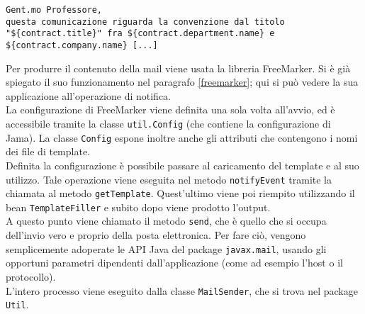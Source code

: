 \begin{lstlisting}
Gent.mo Professore,
questa comunicazione riguarda la convenzione dal titolo "${contract.title}" fra ${contract.department.name} e ${contract.company.name} [...]
\end{lstlisting}

Per produrre il contenuto della mail viene usata la libreria FreeMarker. Si è già spiegato il suo funzionamento nel paragrafo \ref{freemarker}; qui si può vedere la sua applicazione all'operazione di notifica.\\
La configurazione di FreeMarker viene definita una sola volta all'avvio, ed è accessibile tramite la classe \lstinline{util.Config} (che contiene la configurazione di Jama). La classe \lstinline{Config} espone inoltre anche gli attributi che contengono i nomi dei file di template.\\
Definita la configurazione è possibile passare al caricamento del template e al suo utilizzo. Tale operazione viene eseguita nel metodo \lstinline{notifyEvent} tramite la chiamata al metodo \lstinline{getTemplate}. Quest'ultimo viene poi riempito utilizzando il bean \lstinline{TemplateFiller} e subito dopo viene prodotto l'output. \\
A questo punto viene chiamato il metodo \lstinline{send}, che è quello che si occupa dell'invio vero e proprio della posta elettronica. Per fare ciò, vengono semplicemente adoperate le API Java del package \lstinline{javax.mail}, usando gli opportuni parametri dipendenti dall'applicazione (come ad esempio l'host o il protocollo).\\
L'intero processo viene eseguito dalla classe \lstinline{MailSender}, che si trova nel package \lstinline{Util}.
